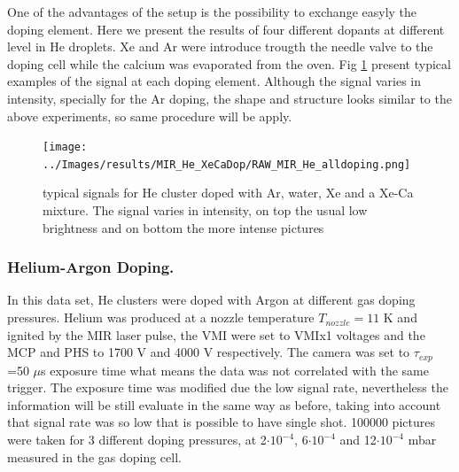 One of the advantages of the setup is the possibility to exchange easyly the doping element. Here we present the results of four different dopants at different level in He droplets. Xe and Ar were introduce trougth the needle valve to the doping cell while the calcium was evaporated from the oven. Fig \ref{fig:He-dopingexample} present typical examples of the signal at each doping element. Although the signal varies in intensity, specially for the Ar doping, the  shape and structure looks similar to the above experiments, so same procedure will be apply.

\begin{figure}[h!]
\centering
\texttt{[image: ../Images/results/MIR\_He\_XeCaDop/RAW\_MIR\_He\_alldoping.png]} 
\caption[MIR He Doping examples]{typical signals for He cluster doped with Ar, water, Xe and a Xe-Ca mixture. The signal varies in intensity, on top the usual low brightness and on bottom the more intense pictures}
\label{fig:He-dopingexample}
\end{figure}

\subsubsection{Helium-Argon Doping.}

In this data set, He clusters were doped with Argon at different gas doping pressures. Helium was produced at a nozzle temperature $T_{nozzle}= 11$ K and ignited by the MIR laser pulse, the VMI were set to VMIx1 voltages and the MCP and PHS to 1700 V and 4000 V respectively. The camera was set to $\tau_{exp}$=50 $\mu$s exposure time what means the data was not correlated with the same trigger. The exposure time was modified due the low signal rate, nevertheless the information will be still evaluate in the same way  as before, taking into account that signal rate was so low that is possible to have single shot.  100000 pictures were taken for 3 different doping pressures, at 2$\cdot10^{-4}$, 6$\cdot10^{-4}$ and 12$\cdot10^{-4}$ mbar measured in the gas doping cell. 

